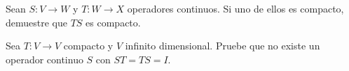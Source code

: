 \begin{ejercicio}\label{ej:lectura-23-3}
Sean $S:V\to W$ y $T:W\to X$ operadores continuos. Si uno de ellos es compacto, demuestre que $TS$ es compacto.
\end{ejercicio}


\begin{ejercicio}\label{ej:lectura-23-4}
Sea $T:V\to V$ compacto y $V$ infinito dimensional. Pruebe que no existe un operador continuo $S$ con $ST=TS=I$.
\end{ejercicio}
